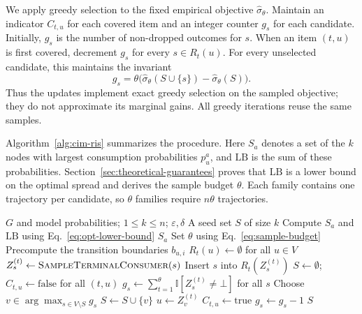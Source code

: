 \documentclass[sigconf]{acmart}
\newcommand{\CIMRIS}{\textsc{CIM-RIS}}
\begin{document}
We apply greedy selection to the fixed empirical objective
$\hat\sigma_\theta$. Maintain an indicator $C_{t,u}$ for each
covered item and an integer counter $g_s$ for each candidate.
Initially, $g_s$ is the number of non-dropped outcomes for $s$.
When an item $(t,u)$ is first covered, decrement $g_s$ for every
$s\in R_t(u)$. For every unselected candidate, this maintains
the invariant
\[
 g_s=\theta\bigl(\hat\sigma_\theta(S\cup\{s\})
                       -\hat\sigma_\theta(S)\bigr).
\]
Thus the updates implement exact greedy selection on the sampled
objective; they do not approximate its marginal gains.
All greedy iterations reuse the same samples.

Algorithm~\ref{alg:cim-ris} summarizes the procedure. Here $S_a$
denotes a set of the $k$ nodes with largest consumption probabilities
$p_u^a$, and $\mathrm{LB}$ is the sum of these probabilities.
Section~\ref{sec:theoretical-guarantees} proves that $\mathrm{LB}$
is a lower bound on the optimal spread and derives the sample
budget $\theta$. Each family contains one trajectory per candidate,
so $\theta$ families require $n\theta$ trajectories.

\begin{algorithm}[t]
\caption{\CIMRIS{}: Trajectory Sampling and Coverage Greedy}
\label{alg:cim-ris}
\begin{algorithmic}[1]
\Require $G$ and model probabilities; $1\le k\le n$; $\varepsilon,\delta$
\Ensure A seed set $S$ of size $k$
\State Compute $S_a$ and $\mathrm{LB}$ using Eq.~\eqref{eq:opt-lower-bound}
  \State \Return $S_a$
\EndIf
\State Set $\theta$ using Eq.~\eqref{eq:sample-budget}
\State Precompute the transition boundaries $b_{u,i}$
  \State $R_t(u)\gets\emptyset$ for all $u\in V$
    \State $Z_s^{(t)}\gets\Call{SampleTerminalConsumer}{s}$
      \State Insert $s$ into $R_t(Z_s^{(t)})$
    \EndIf
  \EndFor
\EndFor
\State $S\gets\emptyset$; $C_{t,u}\gets\mathrm{false}$ for all $(t,u)$
\State $g_s\gets\sum_{t=1}^\theta\mathbb{I}[Z_s^{(t)}\ne\bot]$ for all $s$
  \State Choose $v\in\arg\max_{s\in V\setminus S}g_s$
  \State $S\gets S\cup\{v\}$
    \State $u\gets Z_v^{(t)}$
        \State $C_{t,u}\gets\mathrm{true}$
          \State $g_s\gets g_s-1$
        \EndFor
      \EndIf
    \EndIf
  \EndFor
\EndFor
\State \Return $S$
\end{algorithmic}
\end{algorithm}
\end{document}
